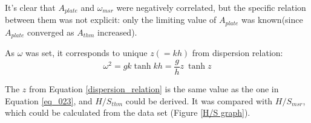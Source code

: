 It's clear that $A_{plate}$ and $\omega_{msr}$ were negatively correlated, but the specific relation between them was not explicit: only the limiting value of $A_{plate}$ was known(since $A_{plate}$ converged as $A_{thm}$ increased).

As $\omega$ was set, it corresponds to unique $z(=kh)$ from dispersion relation:
\begin{equation}
    \omega^{2} = gk \tanh{kh} = \frac{g}{h} z ~\tanh{z}
    \label{dispersion_relation}
\end{equation}

The $z$ from Equation \ref{dispersion_relation} is the same value as the one in Equation \ref{eq_023}, and $H/S_{thm}$ could be derived. It was compared with $H/S_{msr}$, which could be calculated from the data set (Figure \ref{H/S graph}).


